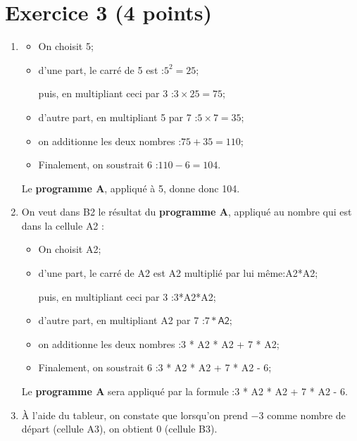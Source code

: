 \documentclass[12pt,a4paper,french]{article}
\begin{document}
\newpage
\section*{Exercice 3 (4 points)}

\begin{enumerate}
	\item \begin{itemize}
		\item On choisit 5;

		\item d'une part, le carré de 5 est :\quad $5^2 = 25$;

		puis, en multipliant ceci par 3 :\quad $3 \times 25 = 75$;

		\item d'autre part, en multipliant 5 par 7 :\quad $5\times 7 = 35$;

		\item on additionne les deux nombres :\quad $75+35=110$;

		\item Finalement, on soustrait 6 :\quad $110-6=104$.
	\end{itemize}
	Le \textbf{programme A}, appliqué à 5, donne donc 104.

	\item On veut dans \textsf{B2} le résultat du \textbf{programme A}, appliqué au nombre qui est dans la cellule \textsf{A2} :
	\begin{itemize}
		\item On choisit \textsf{A2};

		\item d'une part, le carré de \textsf{A2} est \textsf{A2} multiplié par lui même:\quad \textsf{A2*A2};

		puis, en multipliant ceci par 3 :\quad \textsf{3*A2*A2};

		\item d'autre part, en multipliant \textsf{A2} par 7 :\quad $7*\textsf{A2}$;

		\item on additionne les deux nombres :\quad \textsf{3 * A2 * A2 + 7 * A2};

		\item Finalement, on soustrait 6 :\quad \textsf{3 * A2 * A2 + 7 * A2 - 6};
	\end{itemize}
	Le \textbf{programme A} sera appliqué par la formule :\textsf{3 * A2 * A2 + 7 * A2 - 6}.

	\item À l'aide du tableur, on constate que lorsqu'on prend $-3$ comme nombre de départ (cellule \textsf{A3}), on obtient 0 (cellule \textsf{B3}).


\end{enumerate}
\end{document}
